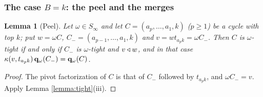 \documentclass{amsart}
\newtheorem{lemma}{Lemma}[section]
\theoremstyle{definition}
\theoremstyle{remark}
\numberwithin{equation}{section}
\begin{document}
\subsubsection*{The case $B=k$: the peel and the merges}

\begin{lemma}[Peel] \label{lemma:peel}
Let $\omega\in S_\infty$ and let $C=(a_p,\ldots,a_1,k)$ ($p\geq1$) be a cycle with top $k$; put $w=\omega C$, $C_-=(a_{p-1},\ldots,a_1,k)$ and $v=wt_{a_pk}=\omega C_-$. Then $C$ is $\omega$-tight if and only if $C_-$ is $\omega$-tight and $v\triangleleft w$, and in that case $\kappa(v,t_{a_pk})\,\mathbf{q}_\omega(C_-)=\mathbf{q}_\omega(C)$.
\end{lemma}
\begin{proof}
The pivot factorization of $C$ is that of $C_-$ followed by $t_{a_pk}$, and $\omega C_-=v$. Apply Lemma \ref{lemma:tight}(iii).
\end{proof}
\end{document}
